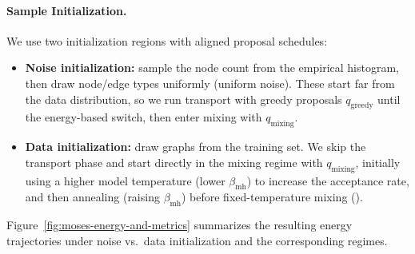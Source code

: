 \paragraph{Sample Initialization.}
\label{init_prop}
We use two initialization regions with aligned proposal schedules:
\begin{itemize}[leftmargin=*]
\vspace{-3pt} \item \textbf{Noise initialization:} sample the node count from the empirical histogram, then draw node/edge
types uniformly (uniform noise). These start far from
the data distribution, so we run transport with greedy proposals $q_{\text{greedy}}$ until the energy-based switch, then enter mixing with
$q_{\mathrm{mixing}}$. 
\vspace{-3pt} \item \textbf{Data initialization:} draw graphs from the training set. We skip the transport phase and start directly in the mixing regime with $q_{\mathrm{mixing}}$, initially using a higher model temperature (lower $\beta_{\mathrm{mh}}$) to increase the acceptance rate, and then annealing (raising $\beta_{\mathrm{mh}}$) before fixed-temperature mixing ().

\end{itemize}
Figure~\ref{fig:moses-energy-and-metrics}
summarizes the resulting energy trajectories under noise vs.\ data initialization and the
corresponding regimes.


